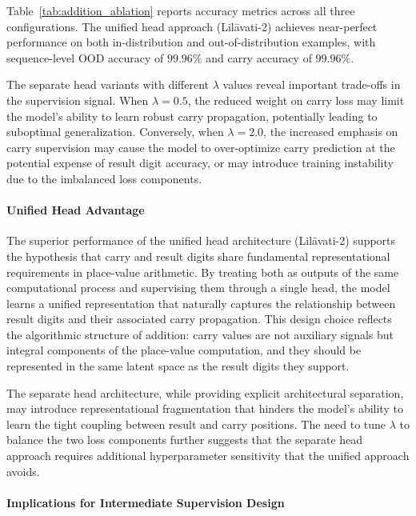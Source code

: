 Table~\ref{tab:addition_ablation} reports accuracy metrics across all three configurations. The unified head approach (Lil\={a}vati-2) achieves near-perfect performance on both in-distribution and out-of-distribution examples, with sequence-level OOD accuracy of $99.96\%$ and carry accuracy of $99.96\%$. 

The separate head variants with different $\lambda$ values reveal important trade-offs in the supervision signal. When $\lambda = 0.5$, the reduced weight on carry loss may limit the model's ability to learn robust carry propagation, potentially leading to suboptimal generalization. Conversely, when $\lambda = 2.0$, the increased emphasis on carry supervision may cause the model to over-optimize carry prediction at the potential expense of result digit accuracy, or may introduce training instability due to the imbalanced loss components.

\paragraph{Unified Head Advantage}

The superior performance of the unified head architecture (Lil\={a}vati-2) supports the hypothesis that carry and result digits share fundamental representational requirements in place-value arithmetic. By treating both as outputs of the same computational process and supervising them through a single head, the model learns a unified representation that naturally captures the relationship between result digits and their associated carry propagation. This design choice reflects the algorithmic structure of addition: carry values are not auxiliary signals but integral components of the place-value computation, and they should be represented in the same latent space as the result digits they support.

The separate head architecture, while providing explicit architectural separation, may introduce representational fragmentation that hinders the model's ability to learn the tight coupling between result and carry positions. The need to tune $\lambda$ to balance the two loss components further suggests that the separate head approach requires additional hyperparameter sensitivity that the unified approach avoids.

\paragraph{Implications for Intermediate Supervision Design}

